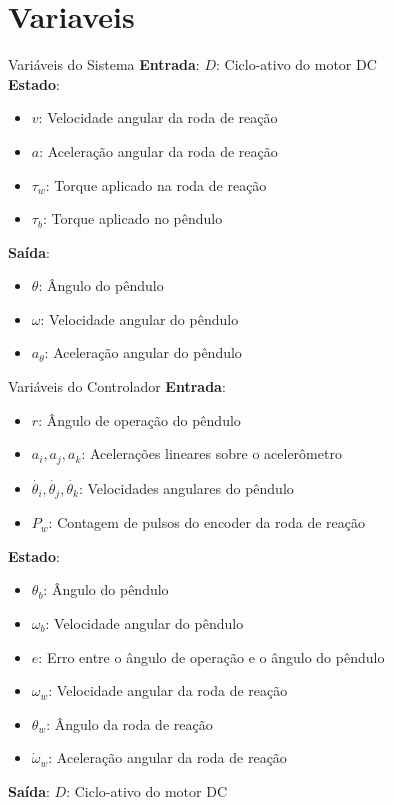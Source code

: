 \section{Variaveis}

\begin{frame}{Variáveis do Sistema}
    \textbf{Entrada}: $D$: Ciclo-ativo do motor DC \\
    \textbf{Estado}:
    \begin{itemize}
        \item $v$: Velocidade angular da roda de reação
        \item $a$: Aceleração angular da roda de reação
        \item $\tau_w$: Torque aplicado na roda de reação
        \item $\tau_b$: Torque aplicado no pêndulo
    \end{itemize}
    \textbf{Saída}:
    \begin{itemize}
        \item $\theta$: Ângulo do pêndulo
        \item $\omega$: Velocidade angular do pêndulo
        \item $a_\theta$: Aceleração angular do pêndulo
    \end{itemize}
\end{frame}

\begin{frame}{Variáveis do Controlador}
    \textbf{Entrada}:
    \begin{itemize}
        \item $r$: Ângulo de operação do pêndulo
        \item $a_i, a_j, a_k$: Acelerações lineares sobre o acelerômetro
        \item $\dot{\theta_i}, \dot{\theta_j}, \dot{\theta_k}$: Velocidades angulares do pêndulo
        \item $P_w$: Contagem de pulsos do encoder da roda de reação
    \end{itemize}

    \textbf{Estado}:
    \begin{itemize}
        \item $\theta_b$: Ângulo do pêndulo
        \item $\omega_b$: Velocidade angular do pêndulo
        \item $e$: Erro entre o ângulo de operação e o ângulo do pêndulo
        \item $\omega_w$: Velocidade angular da roda de reação
        \item $\theta_w$: Ângulo da roda de reação
        \item $\dot{\omega}_w$: Aceleração angular da roda de reação
    \end{itemize}

    \textbf{Saída}: $D$: Ciclo-ativo do motor DC
\end{frame}

